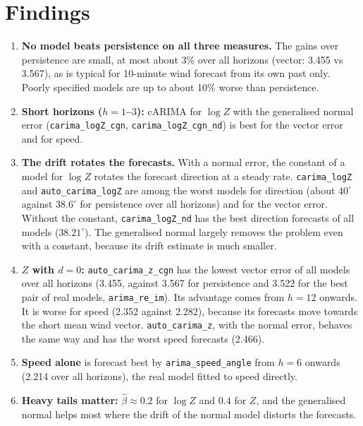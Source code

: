 \documentclass[11pt,a4paper]{article}
\newcommand{\code}[1]{\texttt{#1}}
\begin{document}
\section{Findings}

\begin{enumerate}
  \item \textbf{No model beats persistence on all three measures.} The gains over persistence are
    small, at most about 3\% over all horizons (vector: 3.455 vs 3.567), as is typical for
    10-minute wind forecast from its own past only. Poorly specified models are up to about 10\%
    worse than persistence.
  \item \textbf{Short horizons ($h = 1$--$3$):} cARIMA for $\log Z$ with the generalised normal
    error (\code{carima\_logZ\_cgn}, \code{carima\_logZ\_cgn\_nd}) is best for the vector error and
    for speed.
  \item \textbf{The drift rotates the forecasts.} With a normal error, the constant of a model for
    $\log Z$ rotates the forecast direction at a steady rate. \code{carima\_logZ} and
    \code{auto\_carima\_logZ} are among the worst models for direction (about $40^\circ$ against
    $38.6^\circ$ for persistence over all horizons) and for the vector error. Without the constant,
    \code{carima\_logZ\_nd} has the best direction forecasts of all models ($38.21^\circ$). The
    generalised normal largely removes the problem even with a constant, because its drift
    estimate is much smaller.
  \item \textbf{$Z$ with $d = 0$:} \code{auto\_carima\_z\_cgn} has the lowest vector error of all
    models over all horizons (3.455, against 3.567 for persistence and 3.522 for the best pair of
    real models, \code{arima\_re\_im}). Its advantage comes from $h = 12$ onwards. It is worse for
    speed (2.352 against 2.282), because its forecasts move towards the short mean wind vector.
    \code{auto\_carima\_z}, with the normal error, behaves the same way and has the worst speed
    forecasts (2.466).
  \item \textbf{Speed alone} is forecast best by \code{arima\_speed\_angle} from $h = 6$ onwards
    (2.214 over all horizons), the real model fitted to speed directly.
  \item \textbf{Heavy tails matter:} $\hat\beta \approx 0.2$ for $\log Z$ and $0.4$ for $Z$, and
    the generalised normal helps most where the drift of the normal model distorts the forecasts.
\end{enumerate}
\end{document}
